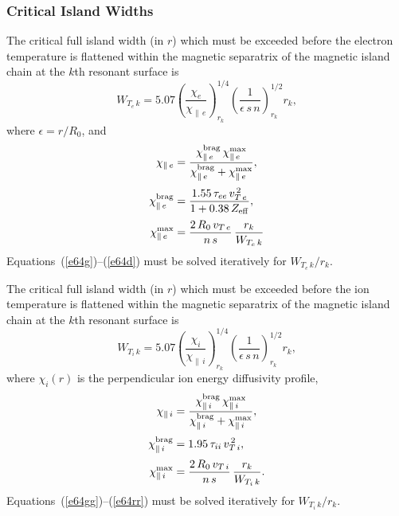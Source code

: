\documentclass[12pt,prb,aps]{revtex4-1}
\begin{document}
\subsubsection{Critical Island Widths}\label{scrit}
The critical full island width (in $r$) which must be exceeded before the electron temperature is flattened within the
magnetic separatrix of the magnetic island chain at the $k$th resonant surface is\,\cite{fitz,brag}
\begin{equation}\label{e64g}
W_{T_e\,k} = 5.07\left(\frac{\chi_e}{\chi_{\parallel\,e}}\right)^{1/4}_{r_k}\left(\frac{1}{\epsilon\,s\,n}\right)^{1/2}_{r_k}r_k,
\end{equation}
where $\epsilon =r/R_0$, and 
\begin{align}
\chi_{\parallel\,e}&= \frac{\chi_{\parallel\,e}^{\rm brag}\,\chi_{\parallel\,e}^{\rm max}}{\chi_{\parallel\,e}^{\rm brag}+\chi_{\parallel\,e}^{\rm max}},\\[0.5ex]
\chi_{\parallel\,e}^{\rm brag} &= \frac{1.55\,\tau_{ee}\,v_{T\,e}^{\,2}}{1+0.38\,Z_{\rm eff}},\\[0.5ex]
\chi_{\parallel\,e}^{\rm max} &= \frac{2\,R_0\,v_{T\,e}}{n\,s}\,\frac{r_k}{W_{T_e\,k}}\label{e64d}
\end{align}
Equations~(\ref{e64g})--(\ref{e64d}) must be solved iteratively for $W_{T_e\,k}/r_k$. 

The critical full island width (in $r$) which must be exceeded before the ion temperature is flattened within the
magnetic separatrix of the magnetic island chain at the $k$th resonant surface is\,\cite{fitz,brag}
\begin{equation}\label{e64gg}
W_{T_i\,k}= 5.07\left(\frac{\chi_i}{\chi_{\parallel\,i}}\right)^{1/4}_{r_k}\left(\frac{1}{\epsilon\,s\,n}\right)^{1/2}_{r_k}r_k,
\end{equation}
where $\chi_i(r)$ is the perpendicular ion energy diffusivity profile, 
\begin{align}
\chi_{\parallel\,i}&= \frac{\chi_{\parallel\,i}^{\rm brag}\,\chi_{\parallel\,i}^{\rm max}}{\chi_{\parallel\,i}^{\rm brag}+\chi_{\parallel\,i}^{\rm max}},\\[0.5ex]
\chi_{\parallel\,i}^{\rm brag} &= 1.95\,\tau_{ii}\,v_{T\,i}^{\,2},\\[0.5ex]
\chi_{\parallel\,i}^{\rm max} &= \frac{2\,R_0\,v_{T\,i}}{n\,s}\,\frac{r_k}{W_{T_i\,k}}.\label{e64rr}
\end{align}
Equations~(\ref{e64gg})--(\ref{e64rr}) must be solved iteratively for $W_{T_i\,k}/r_k$.
\end{document}

